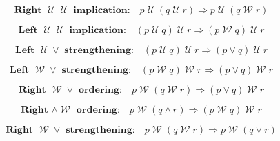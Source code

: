 \documentclass[12pt, fleqn, leqno]{article}
\newcommand{\impl}{\ensuremath{\Rightarrow}}        %
\newcommand{\Until}{\;\mathcal{U}\;}
\newcommand{\Wait}{\;\mathcal{W}\;}
\newcommand{\spacer}{\vspace{-30pt}}
\begin{document}
\spacer

\begin{equation}\label{E:RightUntilUntilImpl}
\textbf{Right $\Until\Until$ implication:}\quad p\Until (q\Until r)\impl p\Until (q\Wait r)
\end{equation}

\spacer

\begin{equation}\label{E:LeftUntilUntilImpl}
\textbf{Left $\Until\Until$ implication:}\quad (p\Until q)\Until r\impl (p\Wait q)\Until r
\end{equation}

\spacer

\begin{equation}\label{E:untilImpAbsR}
\textbf{Left $\Until\lor$ strengthening:}\quad (p \Until q) \Until r \impl (p \lor q) \Until r
\end{equation}

\spacer

\begin{equation}\label{E:waitImpAbsR}
\textbf{Left $\Wait\lor$ strengthening:}\quad (p \Wait q) \Wait r \impl (p \lor q) \Wait r
\end{equation}

%

\spacer

\begin{equation}\label{E:leftAssocWait}
\textbf{Right $\Wait\lor$ ordering:}\quad p \Wait (q \Wait r) \impl (p \lor q) \Wait r
\end{equation}

\spacer

\begin{equation}\label{E:rightAssocWait}
\textbf{Right $\land\Wait$ ordering:}\quad p \Wait (q \land r) \impl (p \Wait q) \Wait r
\end{equation}

\spacer

\begin{equation}\label{E:waitQwaitRImpWaitQorR}
\textbf{Right $\Wait\lor$ strengthening:}\quad p \Wait (q \Wait r) \impl p \Wait (q \lor r)
\end{equation}
\end{document}

